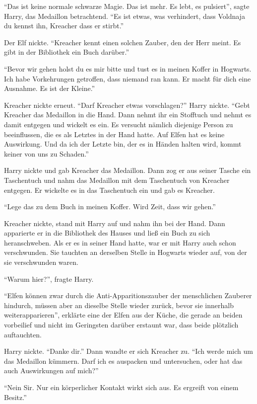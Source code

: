 \enquote{Das ist keine normale schwarze Magie. Das ist mehr. Es lebt, es pulsiert}, sagte Harry, das Medaillon betrachtend. \enquote{Es ist etwas, was verhindert, dass Vold\abs naja du kennst ihn, Kreacher \gst dass er stirbt.}

Der Elf nickte. \enquote{Kreacher kennt einen solchen Zauber, den der Herr meint. Es gibt in der Bibliothek ein Buch darüber.}

\enquote{Bevor wir gehen holst du es mir bitte und tust es in meinen Koffer in Hogwarts. Ich habe Vorkehrungen getroffen, dass niemand ran kann. Er macht für dich eine Ausnahme. Es ist der Kleine.}

Kreacher nickte erneut. \enquote{Darf Kreacher etwas vorschlagen?} Harry nickte. \enquote{Gebt Kreacher das Medaillon in die Hand. Dann nehmt ihr ein Stofftuch und nehmt es damit entgegen und wickelt es ein. Es versucht nämlich diejenige Person zu beeinflussen, die es als Letztes in der Hand hatte. Auf Elfen hat es keine Auswirkung. Und da ich der Letzte bin, der es in Händen halten wird, kommt keiner von uns zu Schaden.}

Harry nickte und gab Kreacher das Medaillon. Dann zog er aus seiner Tasche ein Taschentuch und nahm das Medaillon mit dem Taschentuch von Kreacher entgegen. Er wickelte es in das Taschentuch ein und gab es Kreacher.

\enquote{Lege das zu dem Buch in meinen Koffer. Wird Zeit, dass wir gehen.}

Kreacher nickte, stand mit Harry auf und nahm ihn bei der Hand. Dann apparierte er in die Bibliothek des Hauses und ließ ein Buch zu sich heranschweben. Als er es in seiner Hand hatte, war er mit Harry auch schon verschwunden. Sie tauchten an derselben Stelle in Hogwarts wieder auf, von der sie verschwunden waren.

\enquote{Warum hier?}, fragte Harry.

\enquote{Elfen können zwar durch die Anti-Apparitionszauber der menschlichen Zauberer hindurch, müssen aber an dieselbe Stelle wieder zurück, bevor sie innerhalb weiterapparieren}, erklärte eine der Elfen aus der Küche, die gerade an beiden vorbeilief und nicht im Geringsten darüber erstaunt war, dass beide plötzlich auftauchten.

Harry nickte. \enquote{Danke dir.} Dann wandte er sich Kreacher zu. \enquote{Ich werde mich um das Medaillon kümmern. Darf ich es auspacken und untersuchen, oder hat das auch Auswirkungen auf mich?}

\enquote{Nein Sir. Nur ein körperlicher Kontakt wirkt sich aus. Es ergreift von einem Besitz.}

